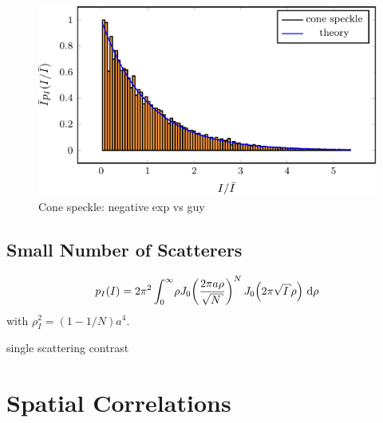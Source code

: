 \begin{figure}
\centering
\includegraphics[keepaspectratio]{figures/spk_ihist.pdf}
\caption{Cone speckle: negative exp vs guy}
\end{figure}

\subsection{Small Number of Scatterers}
\begin{equation}
p_I(I) = 2\pi^2 \int_0^\infty\! \rho J_0\!\left(\frac{2\pi a
\rho}{\sqrt{N}}\right)^N J_0\!\left(2\pi\sqrt{I}\rho\right)\md\rho
\end{equation}
with $\rho_I^2=(1-1/N)a^4$.

single scattering
contrast

\section{Spatial Correlations}


